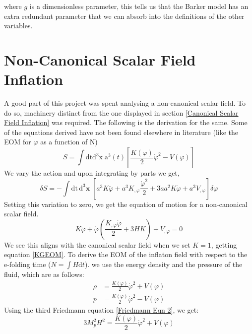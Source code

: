 \documentclass[aps,prd,reprint,preprintnumbers,showpacs,floatfix,nofootinbib,superscript address]{revtex4-2}
\begin{document}
where $g$ is a dimensionless parameter, this tells us that the Barker model has an extra redundant parameter that we can absorb into the definitions of the other variables.
\section{Non-Canonical Scalar Field Inflation} \label{Non-Canonical Scalar Field Inflation}

A good part of this project was spent analysing a non-canonical scalar field. To do so, machinery distinct from the one displayed in section \ref{Canonical Scalar Field Inflation} was required. The following is the derivation for the same. Some of the equations derived have not been found elsewhere in literature (like the EOM for $\varphi$ as a function of N)
\begin{equation} \label{13}
    S = \int \text{dt}\text{d}^3\text{x} \; \text{a}^3(t) \left[ \frac{K(\varphi)}{2}\dot{\varphi}^2 - V(\varphi) \right]
\end{equation}
We vary the action and upon integrating by parts we get,
\begin{equation}
    \delta S = - \int \text{dt}\,\text{d}^3\textbf{x} \; \left[ a^3 K \ddot{\varphi} + a^3K_{,\varphi} \frac{\dot{\varphi}^2}{2}  +  3\dot{a} a^2 K \dot{\varphi} + a^3V_{,\varphi}  \right]\delta \varphi
\end{equation}
Setting this variation to zero, we get the equation of motion for a non-canonical scalar field.
\begin{equation} \label{16}
    K \ddot{\varphi} + \dot{\varphi} \left(\frac{K_{,\varphi} \dot{\varphi}}{2} + 3H K \right) + V_{,\varphi}   = 0
\end{equation}
We see this aligns with the canonical scalar field when we set $K = 1$, getting equation \ref{KGEOM}. To derive the EOM of the inflaton field with respect to the e-folding time ($N = \int H \text{d}t$). we use the energy density and the pressure of the fluid, which are as follows: 
\begin{align}   \label{18}
    \rho &= \frac{K(\varphi)}{2} \dot{\varphi}^2 + V(\varphi) \nonumber \\
    p &= \frac{K(\varphi)}{2} \dot{\varphi}^2 - V(\varphi)
\end{align}
Using the third Friedmann equation \ref{Friedmann Eqn 2}, we get:
\begin{equation}    \label{19}
    3 M_p^2H^2 = \frac{K(\varphi)}{2} \dot{\varphi}^2 + V(\varphi)
\end{equation}
\end{document}
